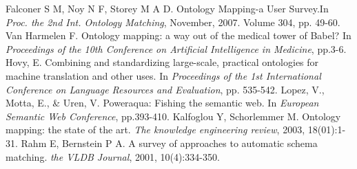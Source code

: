 \documentclass[twoside]{article}
\begin{document}
\begin{thebibliography}{99}
 Falconer S M, Noy N F, Storey M A D. Ontology Mapping-a User Survey.In {\it Proc. the 2nd Int. Ontology Matching}, November, 2007. Volume 304, pp. 49-60.
 Van Harmelen F. Ontology mapping: a way out of the medical tower of Babel? In {\it Proceedings of the 10th Conference on Artificial Intelligence in Medicine}, pp.3-6.
 Hovy, E. Combining and standardizing large-scale, practical ontologies for machine translation and other uses. In {\it Proceedings of the 1st International Conference on Language Resources and Evaluation}, pp. 535-542.
 Lopez, V., Motta, E., \& Uren, V. Poweraqua: Fishing the semantic web. In {\it European Semantic Web Conference}, pp.393-410.
 Kalfoglou Y, Schorlemmer M. Ontology mapping: the state of the art. {\it The knowledge engineering review}, 2003, 18(01):1-31.
 Rahm E, Bernstein P A. A survey of approaches to automatic schema matching. {\it the VLDB Journal}, 2001, 10(4):334-350.



\end{thebibliography}
\end{document}
